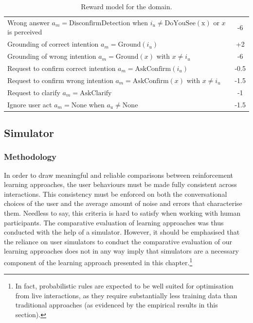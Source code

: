 \begin{table}[ht]
\begin{center}
\begin{footnotesize}
\begin{tabular}{p{130mm}c}
Wrong answer $a_m\!=\!\mathrm{DisconfirmDetection}$ when $i_u\!\neq\!\mathrm{DoYouSee(x)}$ or $x$ is perceived & -6 \\
Grounding of correct intention $a_m\!=\!\mathrm{Ground}(i_u)$ & +2 \\
Grounding of wrong intention  $a_m\!=\!\mathrm{Ground}(x)$ with $x\!\neq\!i_u$ & -6  \\ 
Request to confirm correct intention $a_m\!=\!\mathrm{AskConfirm}(i_u)$ & -0.5 \\
Request to confirm wrong intention  $a_m\!=\!\mathrm{AskConfirm}(x)$ with $x\!\neq\!i_u$ & -1.5  \\ 
Request to clarify $a_m\!=\!\mathrm{AskClarify}$ & -1 \\
Ignore user act $a_m\!=\!\mathrm{None}$ when $a_u\!\neq\!\mathrm{None}$ & -1.5 
\end{tabular}
\end{footnotesize}
\end{center}  
\caption{Reward model for the domain.} 
\label{table:rewards}
\end{table}


\subsection{Simulator}

\subsubsection*{Methodology}

In order to draw meaningful and reliable comparisons between reinforcement learning approaches, the user behaviours must be made fully consistent across interactions.  This consistency must be enforced on both the conversational choices of the user and the average amount of noise and errors that characterise them. Needless to say, this criteria is hard to satisfy when working with human participants. The comparative evaluation of learning approaches was thus conducted with the help of a simulator. However, it should be emphasised that the reliance on user simulators to conduct the comparative evaluation of our learning approaches does not in any way imply that simulators are a necessary component of the learning approach presented in this chapter.\footnote{In fact, probabilistic rules are expected to be well suited for optimisation from live interactions, as they require substantially less training data than traditional approaches (as evidenced by the empirical results in this section).}

